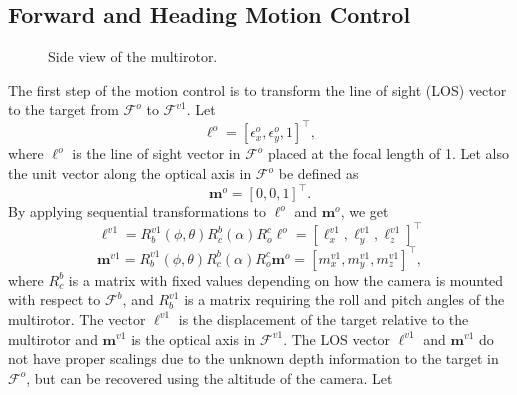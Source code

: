 \subsection{Forward and Heading Motion Control}
\begin{figure}[thpb]
	\centering
	\caption{Side view of the multirotor.}
	\label{side_view}
\end{figure}
The first step of the motion control is to transform the line of sight (LOS) vector to the target from $\mathcal{F}^o$ to $\mathcal{F}^{v1}$. Let 
\begin{equation}
\mathbf{\ell}^o=[\epsilon_x^o, \epsilon_y^o, 1]^\top,
\end{equation} where $\ell^o$ is the line of sight vector in $\mathcal{F}^o$ placed at the focal length of 1. Let also the unit vector along the optical axis in $\mathcal{F}^o$ be defined as 
\begin{equation}
\mathbf{m}^o=[0, 0, 1]^\top.
\end{equation}
By applying sequential transformations to $\ell^o$ and $\mathbf{m}^o$, we get
\begin{equation}
\mathbf{\ell}^{v1}=R^{v1}_b(\phi,\theta)R^b_c(\alpha)R^c_o\ell^o=[\ell^{v1}_x, \ell^{v1}_y, \ell^{v1}_z]^\top
\end{equation}
\begin{equation}
\mathbf{m}^{v1}=R^{v1}_b(\phi,\theta)R^b_c(\alpha)R^c_o\mathbf{m}^o=[m^{v1}_x, m^{v1}_y, m^{v1}_z]^\top,
\end{equation} where $R^b_c$ is a matrix with fixed values depending on how the camera is mounted with respect to $\mathcal{F}^b$, and $R^{v1}_b$ is a matrix requiring the roll and pitch angles of the multirotor. The vector $\ell^{v1}$ is the displacement of the target relative to the multirotor and $\mathbf{m}^{v1}$ is the optical axis in $\mathcal{F}^{v1}$. The LOS vector $\ell^{v1}$ and $\mathbf{m}^{v1}$ do not have proper scalings due to the unknown depth information to the target in $\mathcal{F}^o$, but can be recovered using the altitude of the camera. Let
